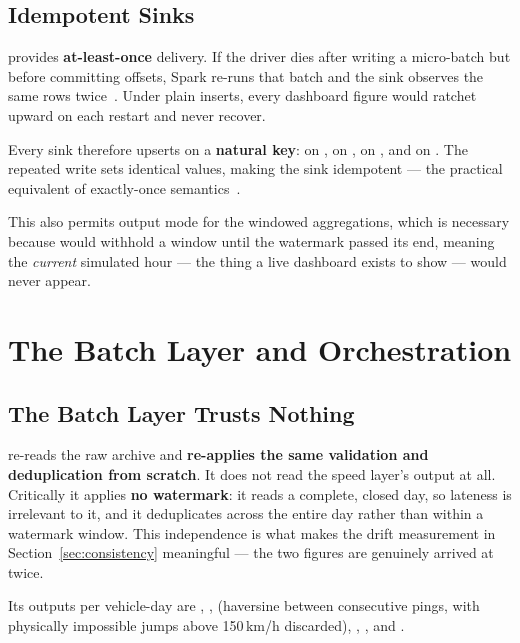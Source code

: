 \subsection{Idempotent Sinks}
\label{sec:impl-sinks}

 provides \textbf{at-least-once} delivery. If the
driver dies after writing a micro-batch but before committing offsets,
Spark re-runs that batch and the sink observes the same rows
twice~\cite{armbrust2018structured}. Under plain inserts, every dashboard
figure would ratchet upward on each restart and never recover.

Every sink therefore upserts on a \textbf{natural key}:
 on , 
on ,  on
, and  on
. The repeated write sets identical
values, making the sink idempotent --- the practical equivalent of
exactly-once semantics~\cite{kleppmann2017ddia}.

This also permits  output mode for the windowed
aggregations, which is necessary because  would withhold a
window until the watermark passed its end, meaning the \emph{current}
simulated hour --- the thing a live dashboard exists to show --- would
never appear.

\section{The Batch Layer and Orchestration}
\label{sec:impl-batch}

\subsection{The Batch Layer Trusts Nothing}
\label{sec:impl-trust}

 re-reads the raw archive and
\textbf{re-applies the same validation and deduplication from scratch}.
It does not read the speed layer's output at all. Critically it applies
\textbf{no watermark}: it reads a complete, closed day, so lateness is
irrelevant to it, and it deduplicates across the entire day rather than
within a watermark window. This independence is what makes the drift
measurement in Section~\ref{sec:consistency} meaningful --- the two
figures are genuinely arrived at twice.

Its outputs per vehicle-day are , ,
 (haversine between consecutive pings, with physically
impossible jumps above 150\,km/h discarded), ,
,  and .


